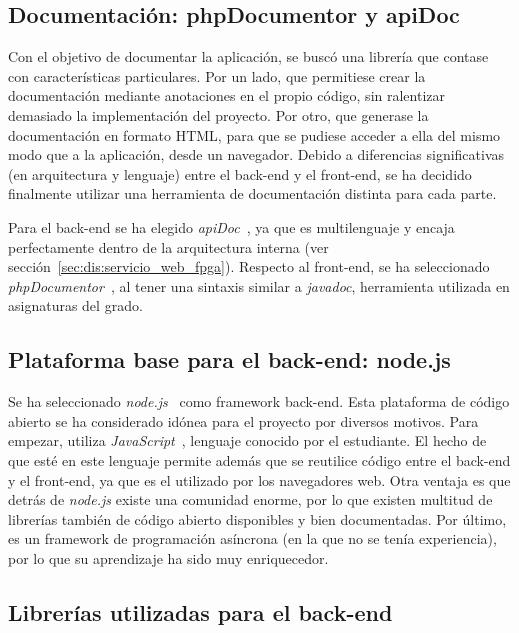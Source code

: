 \subsection*{Documentación: phpDocumentor y apiDoc\label{ssec:dp:docs}}

Con el objetivo de documentar la aplicación, se buscó una librería que contase con características particulares.
Por un lado, que permitiese crear la documentación mediante anotaciones en el propio código, sin ralentizar demasiado la implementación del proyecto.
Por otro, que generase la documentación en formato \gls{HTML}, para que se pudiese acceder a ella del mismo modo que a la aplicación, desde un navegador.
Debido a diferencias significativas (en arquitectura y lenguaje) entre el \gls{back-end} y el \gls{front-end}, se ha decidido finalmente utilizar una herramienta de documentación distinta para cada parte.

Para el \gls{back-end} se ha elegido \textit{apiDoc}~\cite{apidoc}, ya que es multilenguaje y encaja perfectamente dentro de la arquitectura interna (ver sección~\ref{sec:dis:servicio_web_fpga}).
Respecto al \gls{front-end}, se ha seleccionado \textit{phpDocumentor}~\cite{phpdocumentor}, al tener una sintaxis similar a \textit{javadoc}, herramienta utilizada en asignaturas del grado.

\subsection*{Plataforma base para el \gls{back-end}: node.js\label{ssec:dp:back-end}}

Se ha seleccionado \textit{node.js}~\cite{nodejs} como \gls{framework} \gls{back-end}.
Esta plataforma de código abierto se ha considerado idónea para el proyecto por diversos motivos.
Para empezar, utiliza \textit{JavaScript}~\cite{javascript}, lenguaje conocido por el estudiante.
El hecho de que esté en este lenguaje permite además que se reutilice código entre el \gls{back-end} y el \gls{front-end}, ya que es el utilizado por los navegadores web.
Otra ventaja es que detrás de \textit{node.js} existe una comunidad enorme, por lo que existen multitud de librerías también de código abierto disponibles y bien documentadas.
Por último, es un \gls{framework} de programación asíncrona (en la que no se tenía experiencia), por lo que su aprendizaje ha sido muy enriquecedor.

\subsection*{Librerías utilizadas para el \gls{back-end}\label{ssec:dp:back-end-libs}}

